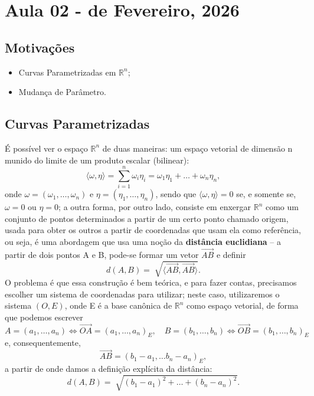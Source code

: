 \documentclass[../differential_geometry.tex]{subfiles}
\begin{document}
\section{Aula 02 - de Fevereiro, 2026}
\subsection{Motivações}
\begin{itemize}
	\item Curvas Parametrizadas em \(\mathbb{R}^{n}\);
	\item Mudança de Parâmetro.
\end{itemize}
\subsection{Curvas Parametrizadas}
É possível ver o espaço \(\mathbb{R}^{n}\) de duas maneiras: um espaço vetorial de dimensão n munido do limite de um produto escalar (bilinear):
\[
	\langle \omega , \eta  \rangle = \sum\limits_{i=1}^{n}\omega_{i}\eta_{i} = \omega_1\eta_1 + \dotsc +\omega_{n}\eta_{n},
\]
onde \(\omega = (\omega_1, \dotsc , \omega_{n})\) e \(\eta = (\eta_1, \dotsc , \eta_{n})\), sendo que \(\langle \omega , \eta  \rangle = 0\) se, e somente se, \(\omega = 0\) ou \(\eta =0\);
a outra forma, por outro lado, consiste em enxergar \(\mathbb{R}^{n}\) como um conjunto de pontos determinados a partir de um certo ponto chamado origem, usada para obter os outros a partir de coordenadas que usam ela como referência, ou seja, é uma abordagem que usa uma noção da \textbf{distância euclidiana} -- a partir de dois pontos A e B, pode-se formar um vetor \(\vec{AB}\) e definir
\[
	d(A, B) = \sqrt[]{\langle \vec{AB}, \vec{AB} \rangle}.
\]
O problema é que essa construção é bem teórica, e para fazer contas, precisamos escolher um sistema de coordenadas para utilizar; neste caso, utilizaremos o sistema \((O, E)\), onde E é a base canônica de \(\mathbb{R}^{n}\) como espaço vetorial, de forma que podemos escrever
\[
	A = (a_1, \dotsc , a_{n}) \Longleftrightarrow \vec{OA} = (a_1,\dotsc ,a_{n})_{E},\quad B = (b_1,\dotsc ,b_{n})\Longleftrightarrow \vec{OB} = (b_1,\dotsc ,b_{n})_{E}
\]
e, consequentemente,
\[
	\vec{AB} = (b_{1}-a_{1}, \dotsc b_{n}-a_{n})_{E},
\]
a partir de onde damos a definição explícita da distância:
\[
	d(A, B)= \sqrt[]{(b_1-a_1)^{2}+\dotsc + (b_{n}-a_{n})^{2}}.
\]
\end{document}
